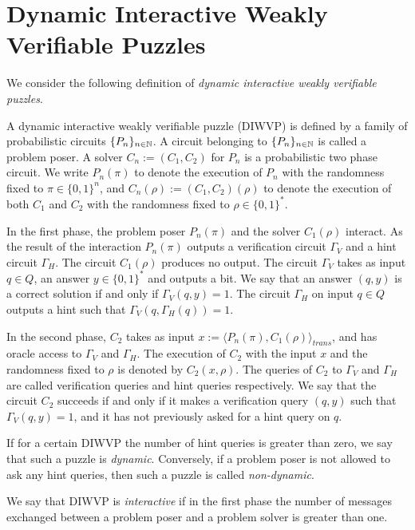 \documentclass[11pt,a4paper,titlepage]{memoir}
\begin{document}
\section{Dynamic Interactive Weakly Verifiable Puzzles}
\label{section:wvp}
We consider the following definition of \textit{dynamic interactive weakly verifiable puzzles}.
\begin{definition}
  \label{def:dwvp}
  A \textnormal{dynamic interactive weakly verifiable puzzle (DIWVP)} is defined by a family of probabilistic circuits $\{P_n\}_{n \in \mathbb{N}}$.
  A circuit belonging to $\{P_n\}_{n \in \mathbb{N}}$ is called a problem poser.
  A solver $C_n := (C_1, C_2)$ for $P_n$ is a probabilistic two phase circuit.
  We write $P_n(\pi)$ to denote the execution of $P_n$ with the randomness fixed to $\pi \in \{0,1\}^n$, and $C_n(\rho) := (C_1,C_2)(\rho)$
  to denote the execution of both $C_1$ and $C_2$ with the randomness fixed to $\rho \in \{0,1\}^{*}$.

  In the first phase, the problem poser $P_n(\pi)$ and the solver $C_1(\rho)$ interact.
  As the result of the interaction $P_n(\pi)$ outputs a verification circuit $\Gamma_{V}$ and a hint circuit $\Gamma_{H}$.
  The circuit $C_1(\rho)$ produces no output.
  The circuit $\Gamma_{V}$ takes as input $q \in Q$, an answer $y \in \{0,1\}^*$
  and outputs a bit. We say that an answer $(q,y)$ is a correct solution if and only if $\Gamma_V(q,y) = 1$.
  The circuit $\Gamma_H$ on input $q \in Q$ outputs a hint such that $\Gamma_V(q,\Gamma_H(q)) = 1$.

  In the second phase, $C_2$ takes as input $x := \langle P_n(\pi), C_1(\rho) \rangle_{\mathit{trans}}$,
  and has oracle access to $\Gamma_V$ and $\Gamma_H$.
  The execution of $C_2$ with the input $x$ and the randomness fixed to $\rho$
  is denoted by $C_2(x, \rho)$. The queries of $C_2$ to $\Gamma_V$ and $\Gamma_H$ are called verification queries and hint queries respectively.
  We say that the circuit $C_2$ \textnormal{succeeds} if and only if it makes a verification query $(q,y)$ such that $\Gamma_V(q,y) = 1$,
  and it has not previously asked for a hint query on $q$.
\end{definition}

If for a certain DIWVP the number of hint queries is greater than zero, we say that such
a puzzle is \textit{dynamic}. Conversely, if a problem poser is not allowed to ask any hint queries, then such a puzzle
is called \textit{non-dynamic}.

We say that DIWVP is \textit{interactive} if in the first phase the number of messages exchanged between a problem poser and a problem
solver is greater than one.
\end{document}
